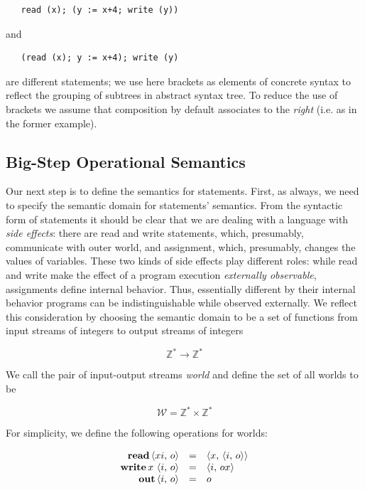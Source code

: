 \begin{lstlisting}
   read (x); (y := x+4; write (y))
\end{lstlisting}

and

\begin{lstlisting}
   (read (x); y := x+4); write (y)
\end{lstlisting}

are different statements; we use here brackets as elements of concrete syntax to reflect the grouping of subtrees in abstract syntax tree.
To reduce the use of brackets we assume that composition by default associates to the \emph{right} (i.e. as in the former example).

\subsection{Big-Step Operational Semantics}

Our next step is to define the semantics for statements. First, as always, we need to specify the semantic domain for statements' semantics.
From the syntactic form of statements it should be clear that we are dealing with a language with \emph{side effects}: there are read and write statements,
which, presumably, communicate with outer world, and assignment, which, presumably, changes the values of variables. These two kinds of side effects
play different roles: while read and write make the effect of a program execution \emph{externally observable}, assignments define internal behavior.
Thus, essentially different by their internal behavior programs can be indistinguishable while observed externally. We reflect this consideration by
choosing the semantic domain to be a set of functions from input streams of integers to output streams of integers

\[
\mathbb{Z}^*\to\mathbb{Z}^*
\]

We call the pair of input-output streams \emph{world} and define the set of all worlds to be

\[
  \mathscr W = \mathbb Z^* \times \mathbb Z^*
\]

For simplicity, we define the following operations for worlds:

\[
\begin{array}{rcl}
  \mathbf{read}\,{\left<{xi,\,o}\right>}    & = & \left<{x,\,\left<{i,\,o}\right>}\right>\\
  \mathbf{write}\,{x\,\left<{i,\,o}\right>} & = & \left<{i,\,ox}\right>\\
  \mathbf{out}\,{\left<{i,\,o}\right>}      & = & o
\end{array}
\]

